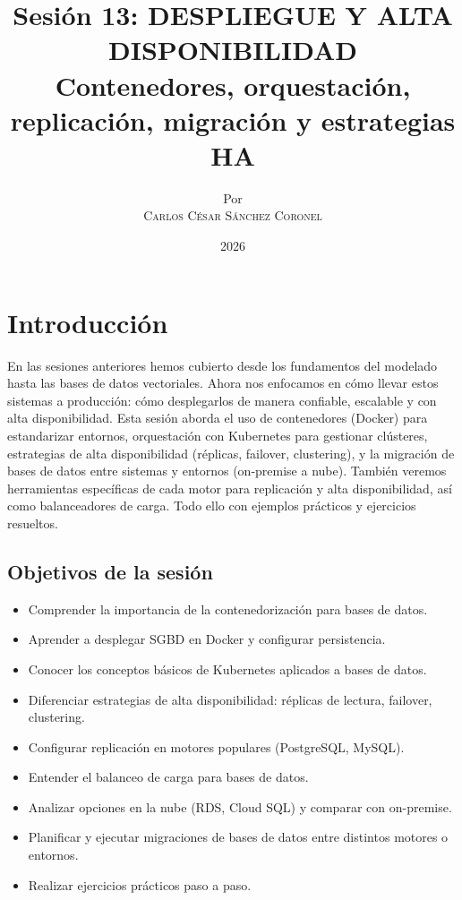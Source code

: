 \documentclass[12pt,a4paper,openany,oneside]{book}
\title{
    \Huge \textbf{Sesión 13: DESPLIEGUE Y ALTA DISPONIBILIDAD} \\
    \large Contenedores, orquestación, replicación, migración y estrategias HA
}
\author{
    \small Por \\ \vspace{0.2cm}
    \Large \textsc{Carlos César Sánchez Coronel}
}
\date{2026}
\begin{document}
\maketitle

\tableofcontents
{}

\chapter{Introducción}
En las sesiones anteriores hemos cubierto desde los fundamentos del modelado hasta las bases de datos vectoriales. Ahora nos enfocamos en cómo llevar estos sistemas a producción: cómo desplegarlos de manera confiable, escalable y con alta disponibilidad. Esta sesión aborda el uso de contenedores (Docker) para estandarizar entornos, orquestación con Kubernetes para gestionar clústeres, estrategias de alta disponibilidad (réplicas, failover, clustering), y la migración de bases de datos entre sistemas y entornos (on-premise a nube). También veremos herramientas específicas de cada motor para replicación y alta disponibilidad, así como balanceadores de carga. Todo ello con ejemplos prácticos y ejercicios resueltos.

\section{Objetivos de la sesión}
\begin{itemize}
    \item Comprender la importancia de la contenedorización para bases de datos.
    \item Aprender a desplegar SGBD en Docker y configurar persistencia.
    \item Conocer los conceptos básicos de Kubernetes aplicados a bases de datos.
    \item Diferenciar estrategias de alta disponibilidad: réplicas de lectura, failover, clustering.
    \item Configurar replicación en motores populares (PostgreSQL, MySQL).
    \item Entender el balanceo de carga para bases de datos.
    \item Analizar opciones en la nube (RDS, Cloud SQL) y comparar con on-premise.
    \item Planificar y ejecutar migraciones de bases de datos entre distintos motores o entornos.
    \item Realizar ejercicios prácticos paso a paso.
\end{itemize}
\end{document}
